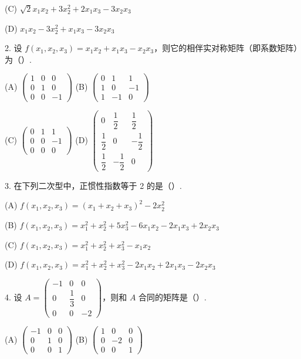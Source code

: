 \documentclass[UTF8,12pt,a4paper,fontset=fandol]{ctexart}
\begin{document}
(C) $\sqrt2x_1x_2+3x_2^2+2x_1x_3-3x_2x_3$

(D) $x_1x_2-3x_2^2+x_1x_3-3x_2x_3$

2. 设 $f(x_1,x_2,x_3)=x_1x_2+x_1x_3-x_2x_3$，则它的相伴实对称矩阵（即系数矩阵）为（\quad ）.

(A) $\left(\begin{array}{ccc}1&0&0\\ 0&1&0\\ 0&0&-1\end{array}\right)$
\qquad
(B) $\left(\begin{array}{ccc}0&1&1\\ 1&0&-1\\ 1&-1&0\end{array}\right)$

(C) $\left(\begin{array}{ccc}0&1&1\\ 0&0&-1\\ 0&0&0\end{array}\right)$
\qquad
(D) $\left(\begin{array}{ccc}0&\dfrac12&\dfrac12\\ \dfrac12&0&-\dfrac12\\ \dfrac12&-\dfrac12&0\end{array}\right)$

3. 在下列二次型中，正惯性指数等于 2 的是（\quad ）.

(A) $f(x_1,x_2,x_3)=(x_1+x_2+x_3)^2-2x_2^2$

(B) $f(x_1,x_2,x_3)=x_1^2+x_2^2+5x_3^2-6x_1x_2-2x_1x_3+2x_2x_3$

(C) $f(x_1,x_2,x_3)=x_1^2+x_2^2+x_3^2-x_1x_2$

(D) $f(x_1,x_2,x_3)=x_1^2+x_2^2+x_3^2-2x_1x_2+2x_1x_3-2x_2x_3$

4. 设 $A=\left(\begin{array}{ccc}-1&0&0\\ 0&\dfrac13&0\\ 0&0&-2\end{array}\right)$，则和 $A$ 合同的矩阵是（\quad ）.

(A) $\left(\begin{array}{ccc}-1&0&0\\ 0&1&0\\ 0&0&1\end{array}\right)$
\qquad
(B) $\left(\begin{array}{ccc}1&0&0\\ 0&-2&0\\ 0&0&1\end{array}\right)$
\end{document}
